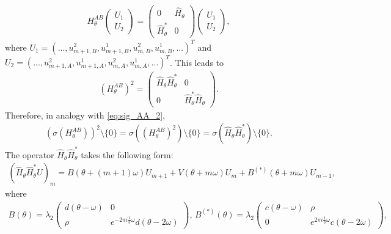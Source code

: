 \documentclass[11pt]{amsart}
\begin{document}
\begin{align}\label{eq:HAB=HH}
    H_{\theta}^{AB}\left(\begin{matrix} U_1\\ U_2\end{matrix}\right)
    =\left(\begin{matrix} 0 &\widehat{H}_{\theta}\\ \widehat{H}_{\theta}^* &0\end{matrix}\right)
    \left(\begin{matrix} U_1\\ U_2\end{matrix}\right),
\end{align}
where $U_1=(...,u_{m+1,B}^2, u_{m+1,B}^1, u_{m,B}^2, u_{m,B}^1,...)^T$ and $U_2=(...,u_{m+1,A}^2, u_{m+1,A}^1, u_{m,A}^2, u_{m,A}^1,...)^T$.
This leads to 
\begin{align}\label{eq:HAB=HH_2}   (H_{\theta}^{AB})^2=\left(\begin{matrix}\widehat{H}_{\theta}\widehat{H}_{\theta}^* &0 \\ 0 &\widehat{H}_{\theta}^* \widehat{H}_{\theta}\end{matrix}\right).
\end{align}
Therefore, in analogy with \eqref{eq:sig_AA_2},  
\begin{align}\label{eq:sig_AB}
    (\sigma(H_{\theta}^{AB}))^2\setminus \{0\}=\sigma((H_{\theta}^{AB})^2)\setminus \{0\}=\sigma(\widehat{H}_{\theta}\widehat{H}_{\theta}^*)\setminus \{0\}.
\end{align}
The operator $\widehat{H}_{\theta}\widehat{H}_{\theta}^*$ takes the following form:
\begin{align}
(\widehat{H}_{\theta}\widehat{H}_{\theta}^*U)_m=B(\theta+(m+1)\omega)U_{m+1}+V(\theta+m\omega)U_m+B^{(*)}(\theta+m\omega)U_{m-1},
\end{align}
where
\begin{align}\label{def:B_AB}
    B(\theta)=\lambda_2\left(\begin{matrix}
        d(\theta-\omega) & 0\\
        \rho &e^{-2\pi i\frac{1}{3}\omega}d(\theta-2\omega)
    \end{matrix}\right),\, B^{(*)}(\theta)=\lambda_2 
    \left(\begin{matrix} c(\theta-\omega) & \rho\\
    0 &e^{2\pi i \frac{1}{3}\omega} c(\theta-2\omega)
    \end{matrix}\right),
\end{align}
\end{document}
